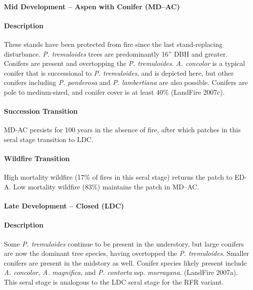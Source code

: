 \noindent\hrulefill

\paragraph{Mid Development – Aspen with Conifer (MD–AC)}

\paragraph{Description} These stands have been protected from fire since the last stand-replacing disturbance. \emph{P. tremuloides} trees are predominantly 16'' DBH and greater. Conifers are present and overtopping the \emph{P. tremuloides}. \emph{A. concolor} is a typical conifer that is successional to \emph{P. tremuloides}, and is depicted here, but other conifers including \emph{P. ponderosa} and \emph{P. lambertiana} are also possible. Conifers are pole to medium-sized, and conifer cover is at least 40\% (LandFire 2007c).

\paragraph{Succession Transition} MD-AC persists for 100 years in the absence of fire, after which patches in this seral stage transition to LDC. 

\paragraph{Wildfire Transition} High mortality wildfire (17\% of fires in this seral stage) returns the patch to ED-A. Low mortality wildfire (83\%) maintains the patch in MD–AC.

\noindent\hrulefill

\paragraph{Late Development – Closed (LDC)}

\paragraph{Description} Some \emph{P. tremuloides} continue to be present in the understory, but large conifers are now the dominant tree species, having overtopped the \emph{P. tremuloides}. Smaller conifers are present in the midstory as well. Conifer species likely present include \emph{A. concolor, A. magnifica}, and \emph{P. contorta} ssp. \emph{murrayana}. (LandFire 2007a). This seral stage is analogous to the LDC seral stage for the RFR variant.

